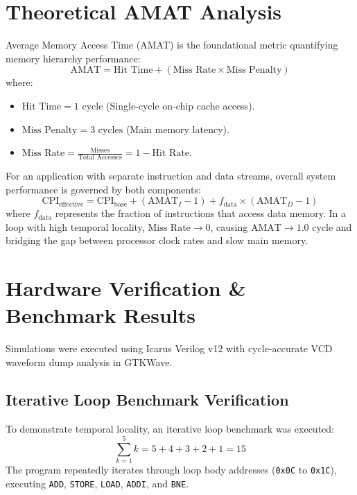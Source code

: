\documentclass[conference]{IEEEtran}
\begin{document}
\section{Theoretical AMAT Analysis}
Average Memory Access Time (AMAT) is the foundational metric quantifying memory hierarchy performance:
\begin{equation}
\text{AMAT} = \text{Hit Time} + (\text{Miss Rate} \times \text{Miss Penalty})
\end{equation}
where:
\begin{itemize}
    \item $\text{Hit Time} = 1\text{ cycle}$ (Single-cycle on-chip cache access).
    \item $\text{Miss Penalty} = 3\text{ cycles}$ (Main memory latency).
    \item $\text{Miss Rate} = \frac{\text{Misses}}{\text{Total Accesses}} = 1 - \text{Hit Rate}$.
\end{itemize}

For an application with separate instruction and data streams, overall system performance is governed by both components:
\begin{equation}
\text{CPI}_{\text{effective}} = \text{CPI}_{\text{base}} + (\text{AMAT}_I - 1) + f_{\text{data}} \times (\text{AMAT}_D - 1)
\end{equation}
where $f_{\text{data}}$ represents the fraction of instructions that access data memory. In a loop with high temporal locality, $\text{Miss Rate} \to 0$, causing $\text{AMAT} \to 1.0\text{ cycle}$ and bridging the gap between processor clock rates and slow main memory.

\section{Hardware Verification \& Benchmark Results}
Simulations were executed using Icarus Verilog v12 with cycle-accurate VCD waveform dump analysis in GTKWave.

\subsection{Iterative Loop Benchmark Verification}
To demonstrate temporal locality, an iterative loop benchmark was executed:
\begin{equation}
\sum_{k=1}^{5} k = 5 + 4 + 3 + 2 + 1 = 15
\end{equation}
The program repeatedly iterates through loop body addresses (\texttt{0x0C} to \texttt{0x1C}), executing \texttt{ADD}, \texttt{STORE}, \texttt{LOAD}, \texttt{ADDI}, and \texttt{BNE}.
\end{document}
